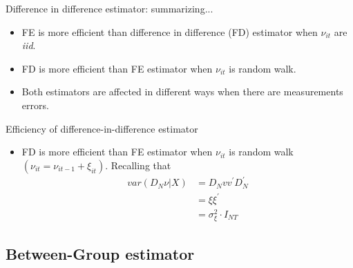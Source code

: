 \begin{frame}{Difference in difference estimator: summarizing...}
	\begin{itemize}
		\item FE is more efficient than difference in difference (FD) estimator when  $\nu_{it}$ are \emph{iid}.
		\item FD is more efficient than FE estimator when $\nu_{it}$ is random walk.
		\item Both estimators are affected in different ways when there are measurements errors.
	\end{itemize}
\end{frame}
\begin{frame}{Efficiency of difference-in-difference estimator}
	\begin{itemize}
		\item FD is more efficient than FE estimator when $\nu_{it}$ is random walk $\left( \nu_{it}=\nu_{it-1}+\xi_{it}\right) $. Recalling that
			\begin{align*}
				var\left( D_{N}\nu |X\right) & = D_{N}vv^{\prime }D_{N}^{\prime } \\
											 & = \xi \xi ^{\prime } \\
											 & = \sigma _{\xi }^{2}\cdot I_{NT}
			\end{align*}
	\end{itemize}
\end{frame}

\subsection{Between-Group estimator}

